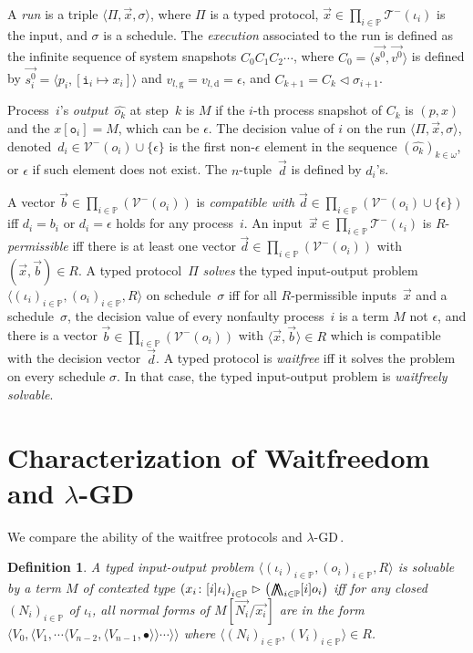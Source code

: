 \documentclass[doctor]{iscs-thesis}
\newcommand{\tuple}[1]{\langle{#1}\rangle}
\newtheorem{definition}{Definition}
\newcommand{\tr}{\vartriangleright}
\newcommand{\update}{\vartriangleleft}
\newcommand{\processes}{\mathbb{P}}
\newcommand{\p}[1]{\texttt{#1}}
\newcommand{\vg}[2]{{#1}_{#2, \mathrm g}}
\newcommand{\vd}[2]{{#1}_{#2, \mathrm d}}
\newcommand{\lterm}[0]{\mathcal{T}^-}
\newcommand{\lval} [0]{\mathcal{V}^-}
\newcommand{\tj}   [2]{ {#1} \colon{#2} }
\newcommand{\lgd}{$\lambda$-GD}
\newcommand{\wwedge}{\operatorname*{\bigwedge\kern -8pt \bigwedge}}
\begin{document}
A \textit{run} is a triple $\tuple{\Pi, \vec x, \sigma}$,
where $\Pi$ is a typed protocol,
$\vec x \in \prod_{i\in \processes} \lterm(\iota_i)$ is the input,
and $\sigma$ is a schedule.
The \textit{execution} associated to the run
is defined as the infinite sequence of system snapshots
$C_0C_1C_2\cdots$, where $C_0 = \tuple{\vec{s^0}, \vec{v^0}}$ is
defined by $\vec{s^0_i} = \tuple{p_i, [\p i_i\mapsto x_i]}$ and
$\vg v l  = \vd v l = \epsilon$,
and $C_{k+1} = C_{k}\update
\sigma_{i+1}$.

Process~$i$'s \textit{output}~$\hat{o_k}$ at step~$k$ is
$M$ if the $i$-th process snapshot of $C_k$ is
$(p, x)$ and the $x[\p{o}_i] = M$, which can be $\epsilon$.
The decision value of $i$ on the run $\tuple{\Pi,\vec x,\sigma}$,
denoted~$d_i \in \lval(o_i)\cup\{\epsilon\}$
 is the first non-$\epsilon$ element in the sequence
 $\left(\hat{o_k}\right)_{k\in\omega}$,
 or
$\epsilon$ if such element does not exist.
The $n$-tuple~$\vec d$ is defined by $d_i$'s.

A vector $\vec b\in \prod_{i\in \processes}(\lval(o_i))$
is \textit{compatible with} $\vec d \in \prod_{i\in
\processes}\left(\lval(o_i)\cup\{\epsilon\}\right)$ iff
$d_i = b_i$ or $d_i = \epsilon$ holds for any process~$i$.
An input~$\vec x\in \prod_{i\in \processes}\lterm(\iota_i)$
is \linebreak[2] $R$-\textit{permissible} iff there is at least one
vector $\vec d\in \prod_{i\in \processes}(\lval(o_i))$ with $(\vec x, \vec b)\in R$.
A typed protocol~$\Pi$ \textit{solves} the typed input-output problem
  $\tuple{(\iota_i)_{i\in \processes}, (o_i)_{i\in \processes}, R}$ on
schedule~$\sigma$ iff for all $R$-permissible inputs~$\vec x$ and a
schedule~$\sigma$,
 the decision value of every nonfaulty process~$i$ is a term
       $M$ not $\epsilon$, and
 there is a vector $\vec b\in \prod_{i\in \processes}(\lval (o_i))$
with $\tuple{\vec x, \vec b} \in R$ which is compatible with the
 decision vector~$\vec d$.
A typed protocol is \textit{waitfree} iff it solves
the problem on every schedule $\sigma$.
In that case, the typed input-output problem is 
\textit{waitfreely solvable}.

\section{Characterization of Waitfreedom and \lgd}
\label{comparison}

We compare the ability of the waitfree protocols and \lgd\,.
\begin{definition}
 A typed input-output problem
 $\tuple{(\iota_i)_{i\in \processes}, (o_i)_{i\in \processes}, R}$ is
 solvable by a term
 $M$ of contexted type
 $\left(\tj{x_i}{[i]\iota_i}\right)_{i\in\processes}
 \tr\left(\wwedge_{i\in
 \processes}[i]o_i\right)$ 
 iff
 for any closed $(N_i)_{i\in \processes}$ of $\iota_i$,
 all normal forms of $M[\vec{N_i}/\vec{x_i}]$
 are in the form
 $\tuple{{V_0}, \tuple{{V_1},
 \cdots\tuple{{V_{n-2}},\tuple{{V_{n-1}},\bullet}}\cdots}}$
 where $\tuple{(N_i)_{i\in \processes}, (V_i)_{i\in \processes}}\in R$.
\end{definition}
\end{document}
